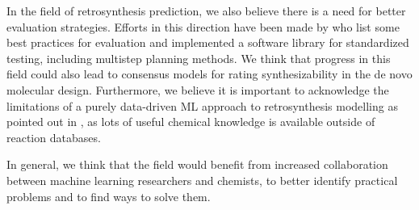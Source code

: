 In the field of retrosynthesis prediction, we also believe there is a need for better evaluation
strategies. Efforts in this direction have been made by
\citet{maziarzReevaluatingRetrosynthesisAlgorithms2024a} who list some best practices for evaluation
and implemented a software library for standardized testing, including multistep planning
methods. We think that progress in this field could also lead to consensus models for rating
synthesizability in the de novo molecular design. Furthermore, we believe it is important to
acknowledge the limitations of a purely data-driven ML approach to retrosynthesis modelling as
pointed out in \citep{strieth-kalthoffArtificialIntelligenceRetrosynthetic2024}, as lots of useful
chemical knowledge is available outside of reaction databases.

In general, we think that the field would benefit from increased collaboration between machine
learning researchers and chemists, to better identify practical problems
\citep{benderArtificialIntelligenceDrug2021} and to find ways to solve them.


